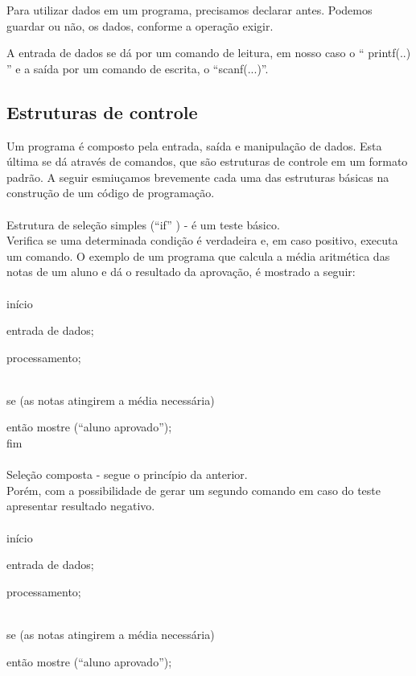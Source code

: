 \documentclass[journal]{IEEEtran}
\begin{document}
Para utilizar dados em um programa, precisamos declarar antes. Podemos guardar ou não, os dados, conforme a operação exigir. 


A entrada de dados se dá por um comando de leitura, em nosso caso o “ printf(..) ” e a saída por um comando de escrita, o “scanf(...)”.


\subsection{Estruturas de controle}
Um programa é composto pela entrada, saída e manipulação de dados. Esta última se dá através de comandos, que são estruturas de controle em um formato padrão. A seguir esmiuçamos brevemente cada uma das estruturas básicas na construção de um código de programação.
\\
\\ Estrutura de seleção simples (“if” ) - é um teste básico.
\\

Verifica se uma determinada condição é verdadeira e, em caso positivo, executa um comando. O exemplo de um programa que calcula a média aritmética das notas de um aluno e dá o resultado da aprovação, é mostrado a seguir:
\\
\\início

	entrada de dados;
	
	processamento;
	
\\se (as notas atingirem a média necessária)

\setlength{\parindent}{10ex}
então mostre (“aluno aprovado”);
\\fim
\setlength{\parindent}{3ex}
\\
\\Seleção composta - segue o princípio da anterior. 
\\

Porém, com a possibilidade de gerar um  segundo comando em caso do teste apresentar resultado negativo.
\\
\\início

	entrada de dados;
	
	processamento;
	
\\se (as notas atingirem a média necessária)

\setlength{\parindent}{10ex}
então mostre (“aluno aprovado”);
\setlength{\parindent}{3ex}
\end{document}
